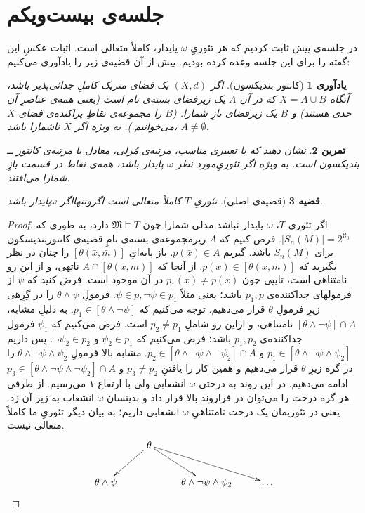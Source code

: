 \documentclass[12pt,a4paper]{report}
\theoremstyle{colorhead}
\newtheorem{thm}{قضیه}
\newtheorem{tam}[thm]{تمرین}
\newtheorem{yad}[thm]{یادآوری}
\begin{document}
\section{جلسه‌ی بیست‌ویکم}
در جلسه‌ی پیش ثابت کردیم که هر تئوریِ
$\omega$
پایدار، کاملاً متعالی است. اثبات عکسِ این گفته را برای این جلسه وعده کرده‌ بودیم. پیش از آن قضیه‌ی زیر را یادآوری می‌کنیم:
\begin{yad}[کانتور بندیکسون]
اگر
$(X,d)$
یک فضای متریک کاملِ جدائی‌پذیر باشد، آنگاه 
$X=A\cup B$
که در آن
$A$
یک زیرفضای بسته‌ی تام است (یعنی همه‌ی عناصرِ آن حدی هستند) و 
$B$
یک زیرفضای بازِ شمارا. ($B$ را مجموعه‌ی نقاطِ پراکنده‌ی فضای
$X$
می‌خوانیم.).  به ویژه اگر
$X$
ناشمارا باشد،
$A\not=\emptyset$.
\end{yad}
\begin{tam}
نشان دهید که با تعبیری مناسب، مرتبه‌ی مُرلی، معادل با مرتبه‌ی کانتور ــ‌ بندیکسون است. به ویژه اگر تئوریِ‌مورد نظر
$\omega$
پایدار باشد، همه‌ی نقاط در قسمت بازِ شمارا می‌افتند. 
\end{tam}
\begin{thm}[قضیه‌ی اصلی]
تئوریِ
$T$
کاملاً متعالی است اگروتنهااگر
$\omega$پایدار 
باشد. 
\end{thm}
\begin{proof}
اگر تئوری $T$، 
$\omega$
پایدار نباشد مدلی شمارا چون
$\mathfrak{M}\models T$
دارد،‌ به طوری که 
\mbox{$|S_n(M)|=2^{\aleph_0}$}.
فرض کنیم که 
$A$
زیرمجموعه‌ی بسته‌ی تامِ  قضیه‌ی کانتوربندیسکون برای
$S_n(M)$
باشد. گیریم
$p(\bar{x})\in A$.
باز پایه‌ایِ
$[\theta(\bar{x}, \bar{m})]$
را چنان در نظر بگیرید که 
\mbox{$p(\bar{x})\in [\theta(\bar{x},\bar{m})]$}.
از آنجا که 
$A\cap [\theta(\bar{x},\bar{m})]$
ناتهی،‌ و از این رو
نامتناهی است، تایپی چون
$p_1(\bar{x})\not=p(\bar{x})$
در آن موجود است. 
فرض کنید که
$\psi$
از فرمولهای
جداکننده‌ی
$p_1,p$
باشد؛ یعنی مثلاً
$\psi\in p,\neg \psi\in p_1$.
فرمولِ
$\theta\wedge\psi$
را در گِرِهی زیرِ فرمولِ
$\theta$
قرار می‌دهیم. توجه می‌کنیم که
$p_1\in [\theta\wedge\neg \psi]$.
به دلیلِ مشابه،
$[\theta\wedge\neg \psi]\cap A$
نامتناهی، و ازاین رو شاملِ
$p_2\not=p_1$
است. فرض می‌کنیم که 
$\psi_1$
فرمول جداکننده‌ی
$p_1,p_2$
باشد؛ فرض می‌کنیم که 
$\psi_2\in p_1$
و
$\neg \psi_2\in p_2$.
پس داریم
$p_1\in [\theta\wedge\neg \psi\wedge\psi_2]$
و
$p_2\in [\theta\wedge\neg \psi\wedge\neg \psi_2]\cap A$.
مشابه‌ بالا فرمولِ
$\theta\wedge\neg \psi\wedge\psi_2$
را در گره زیرِ
$\theta$
قرار می‌دهیم و همین کار را یافتنِ
$p_3\not=p_2$
و 
$p_3\in [\theta\wedge\neg \psi\wedge\neg \psi_2]\cap A$
ادامه می‌دهیم. در این روند به درختی 
$\omega$
انشعابی ولی با ارتفاع ۱ می‌رسیم. از طرفی هر گره‌ درخت را می‌توان در فراروند بالا قرار داد و بدینسان
$\omega$
انشعاب به زیر آن زد. یعنی در تئوریمان یک درخت نامتناهیِ
$\omega$
انشعابی داریم؛ به بیان دیگر تئوریِ ما کاملاً متعالی نیست. 
\[
\xymatrix{
&\theta\ar[dl]\ar[dr]\ar[drr]&\\
\theta\wedge\psi&&\theta\wedge\neg\psi\wedge\psi_2& \ldots
}
\]
\end{proof}
\pagebreak 
\end{document}

